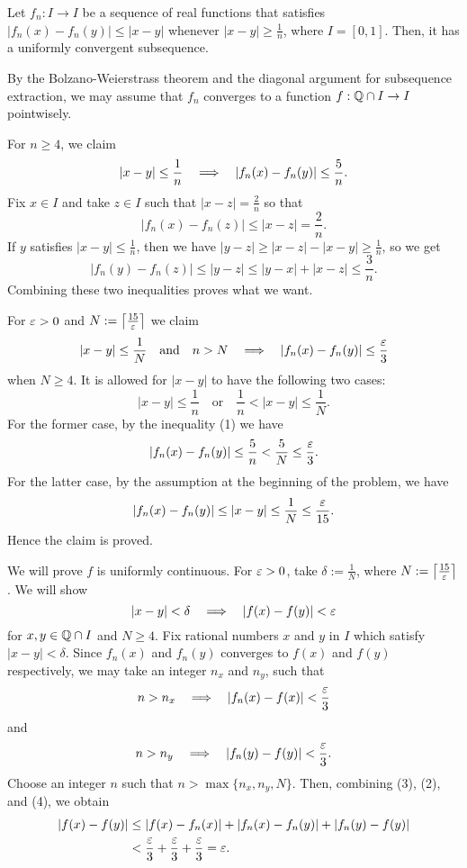 \documentclass[11pt]{article}
\begin{document}
\clearpage
\begin{prb}
Let $f_n:I\to I$ be a sequence of real functions that satisfies $|f_n(x)-f_n(y)|\le|x-y|$ whenever $|x-y|\ge\frac1n$, where $I=[0,1]$.
Then, it has a uniformly convergent subsequence.
\end{prb}
\begin{sol}
By the Bolzano-Weierstrass theorem and the diagonal argument for subsequence extraction, we may assume that $f_n$ converges to a function $f:\Q\cap I\to I$ pointwisely.

\Step[1]
For $n\ge4$, we claim
\begin{align}|x-y|\le\frac1n\impl|f_n(x)-f_n(y)|\le\frac5n.\end{align}
Fix $x\in I$ and take $z\in I$ such that $|x-z|=\frac2n$ so that
\[|f_n(x)-f_n(z)|\le|x-z|=\frac2n.\]
If $y$ satisfies $|x-y|\le\frac1n$, then we have $|y-z|\ge|x-z|-|x-y|\ge\frac1n$, so we get
\[|f_n(y)-f_n(z)|\le|y-z|\le|y-x|+|x-z|\le\frac3n.\]
Combining these two inequalities proves what we want.

\Step[2]
For $\varepsilon>0$ and $N:=\left\lceil\frac{15}{\varepsilon}\right\rceil$ we claim
\begin{align}|x-y|\le\frac1N\quad\text{and}\quad n>N\impl|f_n(x)-f_n(y)|\le\frac\e3\end{align}
when $N\ge4$.
It is allowed for $|x-y|$ to have the following two cases:
\[|x-y|\le\frac1n\quad\text{or}\quad\frac1n<|x-y|\le\frac1N.\]
For the former case, by the inequality (1) we have
\[|f_n(x)-f_n(y)|\le\frac5n<\frac5N\le\frac{\varepsilon}3.\]
For the latter case, by the assumption at the beginning of the problem, we have
\[|f_n(x)-f_n(y)|\le|x-y|\le\frac1N\le\frac{\varepsilon}{15}.\]
Hence the claim is proved.

\Step[3]
We will prove $f$ is uniformly continuous.
For $\varepsilon>0$, take $\delta:=\frac1N$, where $N:=\left\lceil\frac{15}{\varepsilon}\right\rceil$.
We will show
\[|x-y|<\delta\impl|f(x)-f(y)|<\e\]
for $x,y\in\mathbb{Q}\cap I$ and $N\ge4$.
Fix rational numbers $x$ and $y$ in $I$ which satisfy $|x-y|<\delta$.
Since $f_n(x)$ and $f_n(y)$ converges to $f(x)$ and $f(y)$ respectively, we may take an integer $n_x$ and $n_y$, such that
\begin{align}n>n_x\impl |f_n(x)-f(x)|<\frac\e3\end{align}
and
\begin{align}n>n_y\impl |f_n(y)-f(y)|<\frac\e3.\end{align}
Choose an integer $n$ such that $n>\max\{n_x,n_y,N\}$.
Then, combining (3), (2), and (4), we obtain
\begin{align*}
|f(x)-f(y)|&\le|f(x)-f_n(x)|+|f_n(x)-f_n(y)|+|f_n(y)-f(y)|\\
&<\frac{\varepsilon}3+\frac{\varepsilon}3+\frac{\varepsilon}3=\varepsilon.
\end{align*}


\end{sol}
\end{document}
